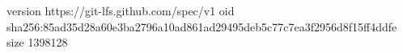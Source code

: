 version https://git-lfs.github.com/spec/v1
oid sha256:85ad35d28a60e3ba2796a10ad861ad29495deb5c77c7ea3f2956d8f15ff4ddfe
size 1398128
